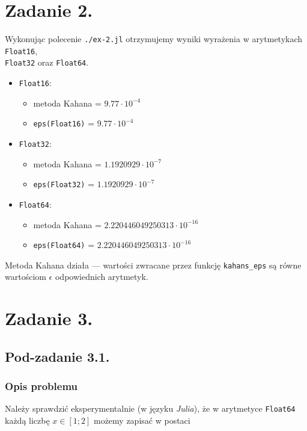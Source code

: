 \documentclass[10pt]{article}
\begin{document}
\section{Zadanie 2.}

Wykonując polecenie \texttt{./ex-2.jl} otrzymujemy wyniki wyrażenia w arytmetykach \texttt{Float16},\\ \texttt{Float32} oraz \texttt{Float64}.

\begin{itemize}
    \item \texttt{Float16}:
    \begin{itemize}
        \item metoda Kahana = $9.77 \cdot 10^{-4}$
        \item \texttt{eps(Float16)} = $9.77 \cdot 10^{-4}$
    \end{itemize}
    \item \texttt{Float32}:
    \begin{itemize}
        \item metoda Kahana = $1.1920929 \cdot 10^{-7}$
        \item \texttt{eps(Float32)} = $1.1920929 \cdot 10^{-7}$
    \end{itemize}
    \item \texttt{Float64}:
    \begin{itemize}
        \item metoda Kahana = $2.220446049250313 \cdot 10^{-16}$
        \item \texttt{eps(Float64)} = $2.220446049250313 \cdot 10^{-16}$
    \end{itemize}
\end{itemize}

Metoda Kahana działa — wartości zwracane przez funkcję \texttt{kahans\_eps} są równe wartościom $\epsilon$ odpowiednich arytmetyk.

\section{Zadanie 3.}

\subsection{Pod-zadanie 3.1.}\label{z3.1.}

\subsubsection{Opis problemu}
Należy sprawdzić eksperymentalnie (w języku \textit{Julia}), że w arytmetyce \texttt{Float64} każdą liczbę $x \in [1;2]$ możemy zapisać w postaci
\end{document}
